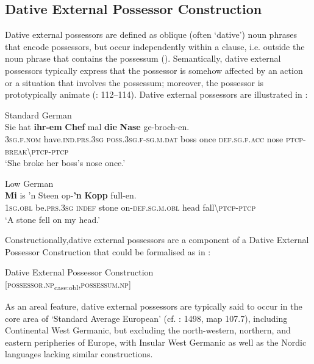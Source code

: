 \documentclass[output=paper]{langsci/langscibook}
\begin{document}
 
 \subsection{Dative External Possessor Construction}\label{sec:hoeder:4.6}

Dative external possessors are defined as oblique (often ‘dative’) noun phrases that encode possessors, but occur independently within a clause, i.e. outside the noun phrase that contains the possessum (\citealt{Haspelmath.1999, Haspelmath.2001, Konig.2001}). Semantically, dative external possessors typically express that the possessor is somehow affected by an action or a situation that involves the possessum; moreover, the possessor is prototypically animate (\citealt{Haspelmath.1999}: 112–114). Dative external possessors are illustrated in :

 
\ea\label{ex:hoeder:20}
	\ea\label{ex:hoeder:20a}
	Standard German\\
	\gll Sie hat \textbf{ihr-em} \textbf{Chef} mal \textbf{die} \textbf{Nase} ge-broch-en.\\
     3\textsc{sg.f.nom} have.\textsc{ind.prs.3sg} \textsc{poss.3sg.f-sg.m.dat} boss once \textsc{def.sg.f.acc} nose \textsc{ptcp-break{\textbackslash}ptcp-ptcp}\\
	\glt `She broke her boss’s nose once.'

	\ex\label{ex:hoeder:20b}
	Low German\\
	\gll \textbf{Mi} is ’n Steen op-\textbf{’n} \textbf{Kopp} full-en.\\
     1\textsc{sg.obl} be.\textsc{prs.3sg} \textsc{indef} stone on-\textsc{def.sg.m.obl} head fall{\textbackslash}\textsc{ptcp-ptcp}\\
	\glt `A stone fell on my head.'
\z
\z

Constructionally,dative external possessors are a component of a Dative External Possessor Construction that could be formalised as in :

\ea
\label{ex:hoeder:21}
	Dative External Possessor Construction\\
     {[}\textsc{possessor.np}\textsubscript{case:obl},\textsc{possessum.np}{]}
  \z
  
  
As an areal feature, dative external possessors are typically said to{} occur in the core area of ‘Standard Average European’ (cf. \citealt{Haspelmath.2001}: 1498, map 107.7), including Continental West Germanic, but excluding the north-western, northern, and eastern peripheries of Europe, with Insular West Germanic as well as the Nordic languages lacking similar constructions.
\end{document}
